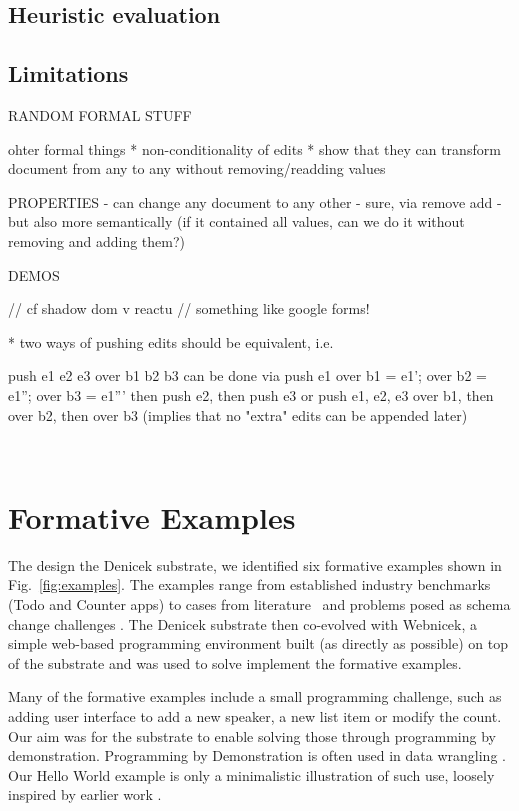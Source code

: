 \documentclass[sigconf,anonymous,screen]{acmart}
\begin{document}
\subsection{Heuristic evaluation}
\subsection{Limitations}

RANDOM FORMAL STUFF

ohter formal things
* non-conditionality of edits
* show that they can transform document from any to any without removing/readding values


PROPERTIES
- can change any document to any other - sure, via remove add - but also more semantically
(if it contained all values, can we do it without removing and adding them?)

DEMOS

// cf shadow dom v reactu
// something like google forms!

* two ways of pushing edits should be equivalent, i.e.

push e1 e2 e3 over b1 b2 b3 can be done via
  push e1 over b1 = e1'; over b2 = e1''; over b3 = e1'''
  then push e2, then push e3
or
  push e1, e2, e3 over b1, then over b2, then over b3
(implies that no "extra" edits can be appended later)






\newpage
~
\newpage



\appendix
\section{Formative Examples}
\label{app:examples}

The design the Denicek substrate, we identified six formative examples shown in
Fig.~\ref{fig:examples}. The examples range from established industry benchmarks
(Todo and Counter apps) to cases from literature~\cite{edwards-2022-copypaste} and
problems posed as schema change challenges \cite{edwards-2025-schema}.
The Denicek substrate then co-evolved with Webnicek, a simple web-based programming environment
built (as directly as possible) on top of the substrate and was used to solve implement the
formative examples.

Many of the formative examples include a small programming challenge, such as adding
user interface to add a new speaker, a new list item or modify the count. Our aim was for
the substrate to enable solving  those through programming by demonstration.
Programming by Demonstration is often used in data wrangling
\cite{gulwani-2012-spreadsheet,drossos-2020-wrex,gulwani-2014-flash}. Our Hello World example
is only a minimalistic illustration of such use, loosely inspired by earlier work \cite{miller-2001-simult}.
\end{document}
